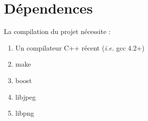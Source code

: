 \section{Dépendences}
La compilation du projet nécessite :
\begin{enumerate}
  \item Un compilateur C++ récent (\textsl{i.e.} gcc 4.2+)
  \item make
  \item boost
  \item libjpeg
  \item libpng
\end{enumerate}

